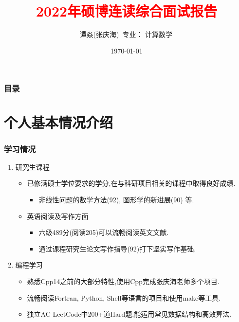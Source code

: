 \documentclass[UTF8]{ctexbeamer}	%
\title{\textcolor{red}{2022年硕博连读综合面试报告}}
\author{谭焱(张庆海)\, \newline   \newline 专业： 计算数学\, 
 }
\date{\today}
\theoremstyle{plain}
\theoremstyle{definition}
\newtheorem{emt}{}[section]
\theoremstyle{remark}
\numberwithin{equation}{section}
\begin{document}

\begin{frame}
\titlepage
\end{frame}


\begin{frame}
    \frametitle{目录}
    \tableofcontents
  \end{frame}

\section{个人基本情况介绍}


        


\begin{frame}[fragile]
    \frametitle{学习情况}
\begin{enumerate}
    \item 研究生课程
    \begin{itemize}
        \item 已修满硕士学位要求的学分,在与科研项目相关的课程中取得良好成绩.
        \begin{itemize}
            \item 非线性问题的数学方法(92), 图形学的新进展(90) 等.
        \end{itemize}
        \item 英语阅读及写作方面
        \begin{itemize}
            \item 六级489分(阅读205)可以流畅阅读英文文献.
            \item 通过课程研究生论文写作指导(92)打下坚实写作基础.
        \end{itemize}
    \end{itemize}
    \item 编程学习
    \begin{itemize}
        \item 熟悉Cpp14之前的大部分特性,使用Cpp完成张庆海老师多个项目.
        \item 流畅阅读Fortran, Python, Shell等语言的项目和使用make等工具.
        \item 独立AC LeetCode中200+道Hard题,能运用常见数据结构和高效算法.
    \end{itemize}
\end{enumerate}
\end{frame}
\end{document}
